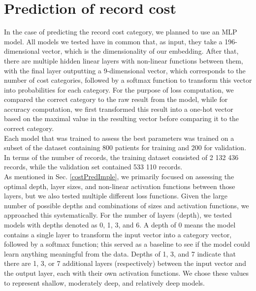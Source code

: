 
\section{Prediction of record cost}
\label{costPredRes}

In the case of predicting the record cost category, we planned to use an MLP model. All models we tested have in common that, as input, they take a 196-dimensional vector, which is the dimensionality of our embedding. After that, there are multiple hidden linear layers with non-linear functions between them, with the final layer outputting a 9-dimensional vector, which corresponds to the number of cost categories, followed by a softmax function to transform this vector into probabilities for each category. For the purpose of loss computation, we compared the correct category to the raw result from the model, while for accuracy computation, we first transformed this result into a one-hot vector based on the maximal value in the resulting vector before comparing it to the correct category.
\\

Each model that was trained to assess the best parameters was trained on a subset of the dataset containing 800 patients for training and 200 for validation. In terms of the number of records, the training dataset consisted of 2 132 436 records, while the validation set contained 533 110 records.
\\

As mentioned in Sec. \ref{costPredImple}, we primarily focused on assessing the optimal depth, layer sizes, and non-linear activation functions between those layers, but we also tested multiple different loss functions. Given the large number of possible depths and combinations of sizes and activation functions, we approached this systematically. For the number of layers (depth), we tested models with depths denoted as 0, 1, 3, and 6. A depth of 0 means the model contains a single layer to transform the input vector into a category vector, followed by a softmax function; this served as a baseline to see if the model could learn anything meaningful from the data. Depths of 1, 3, and 7 indicate that there are 1, 3, or 7 additional layers (respectively) between the input vector and the output layer, each with their own activation functions. We chose these values to represent shallow, moderately deep, and relatively deep models.
\\

